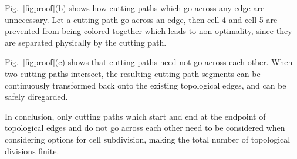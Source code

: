 \documentclass[journal]{IEEEtran}
\begin{document}
Fig.~\ref{figproof}(b) shows how cutting paths which go across any edge are unnecessary. %
Let a cutting path go across an edge, then cell 4 and cell 5 are prevented from being colored together which leads to non-optimality, since they are separated physically by the cutting path.

Fig.~\ref{figproof}(c) shows that cutting paths need not go across each other. When two cutting paths intersect, 
the resulting cutting path segments can be continuously transformed back onto the existing topological edges, and can be safely diregarded.

In conclusion, only cutting paths which start and end at the endpoint of topological edges and do not go across each other need to be considered when considering options for cell subdivision, making the total number of topological divisions finite. 
\end{document}
